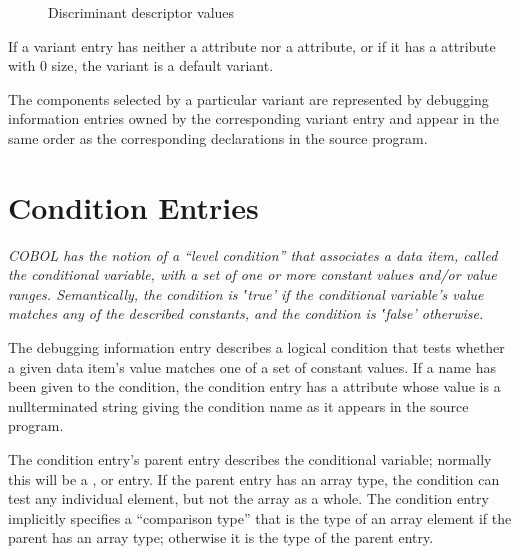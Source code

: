 \begin{figure}[here]
\caption{Discriminant descriptor values}\label{fig:discriminantdescriptorvalues}
\end{figure}

If a variant entry has neither a 
attribute nor a  attribute, or if it has
a  attribute with 0 size, the variant is a
default variant.

The components selected by a particular variant are represented
by debugging information entries owned by the corresponding
variant entry and appear in the same order as the corresponding
declarations in the source program.

\section{Condition Entries}
\label{chap:conditionentries}

\textit{COBOL has the notion of a ``level condition'' that
associates a data item, called the conditional variable, with
a set of one or more constant values and/or value ranges.
Semantically, the condition is ‛true’ if the conditional
variable's value matches any of the described constants,
and the condition is ‛false’ otherwise.}

The  debugging information entry
describes a
logical condition that tests whether a given data item’s
value matches one of a set of constant values. If a name
has been given to the condition, the condition entry has a
 attribute whose value is a null\dash terminated string
giving the condition name as it appears in the source program.

The condition entry's parent entry describes the conditional
variable; normally this will be a ,
 or  entry. If the parent
entry has an array type, the condition can test any individual
element, but not the array as a whole. The condition entry
implicitly specifies a “comparison type” that is the
type of an array element if the parent has an array type;
otherwise it is the type of the parent entry.

